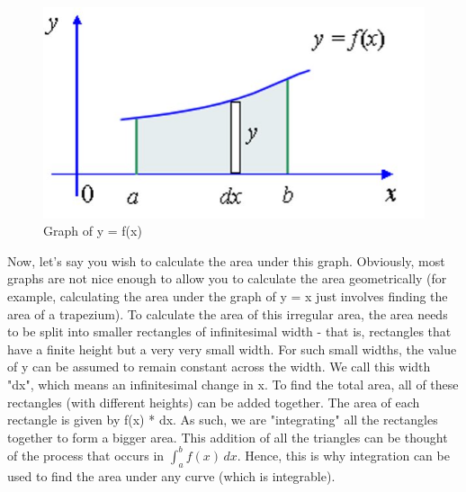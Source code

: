 \documentclass[a4paper,12pt,oneside]{book}
\begin{document}
\begin{figure}[H]
    \begin{center}
        \includegraphics[scale=0.75]{img/Ishan/Image 2.png}
        \caption{Graph of y = f(x)}
        \label{fig:pr2}
    \end{center}
\end{figure}
Now, let's say you wish to calculate the area under this graph. Obviously, most graphs are not nice enough to allow you to calculate the area geometrically (for example, calculating the area under the graph of y = x just involves finding the area of a trapezium). To calculate the area of this irregular area, the area needs to be split into smaller rectangles of infinitesimal width - that is, rectangles that have a finite height but a very very small width. For such small widths, the value of y can be assumed to remain constant across the width. We call this width "dx", which means an infinitesimal change in x. \newline \newline To find the total area, all of these rectangles (with different heights) can be added together. The area of each rectangle is given by f(x) * dx. As such, we are "integrating" all the rectangles together to form a bigger area. This addition of all the triangles can be thought of the process that occurs in \(\int_{a}^{b} f(x) \,dx\). Hence, this is why integration can be used to find the area under any curve (which is integrable). 

\end{document}
